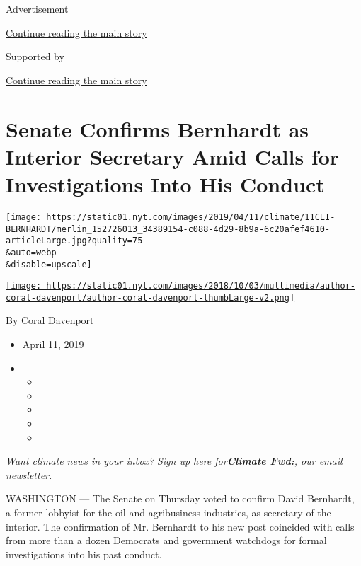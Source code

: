 Advertisement

\protect\hyperlink{after-top}{Continue reading the main story}

Supported by

\protect\hyperlink{after-sponsor}{Continue reading the main story}

\hypertarget{senate-confirms-bernhardt-as-interior-secretary-amid-calls-for-investigations-into-his-conduct}{%
\section{Senate Confirms Bernhardt as Interior Secretary Amid Calls for
Investigations Into His
Conduct}\label{senate-confirms-bernhardt-as-interior-secretary-amid-calls-for-investigations-into-his-conduct}}

\texttt{[image: https://static01.nyt.com/images/2019/04/11/climate/11CLI-BERNHARDT/merlin\_152726013\_34389154-c088-4d29-8b9a-6c20afef4610-articleLarge.jpg?quality=75\\\&auto=webp\\\&disable=upscale]}

\href{https://www.nytimes.com/by/coral-davenport}{\texttt{[image: https://static01.nyt.com/images/2018/10/03/multimedia/author-coral-davenport/author-coral-davenport-thumbLarge-v2.png]}}

By \href{https://www.nytimes.com/by/coral-davenport}{Coral Davenport}

\begin{itemize}
\item
  April 11, 2019
\item
  \begin{itemize}
  \item
  \item
  \item
  \item
  \item
  \end{itemize}
\end{itemize}

\emph{Want climate news in your inbox?}
\href{https://www.nytimes.com/newsletters/climate-change}{\emph{Sign up
here
for}}\textbf{\href{https://www.nytimes.com/newsletters/climate-change}{\emph{Climate
Fwd:}}}\emph{, our email newsletter.}

WASHINGTON --- The Senate on Thursday voted to confirm David Bernhardt,
a former lobbyist for the oil and agribusiness industries, as secretary
of the interior. The confirmation of Mr. Bernhardt to his new post
coincided with calls from more than a dozen Democrats and government
watchdogs for formal investigations into his past conduct.

